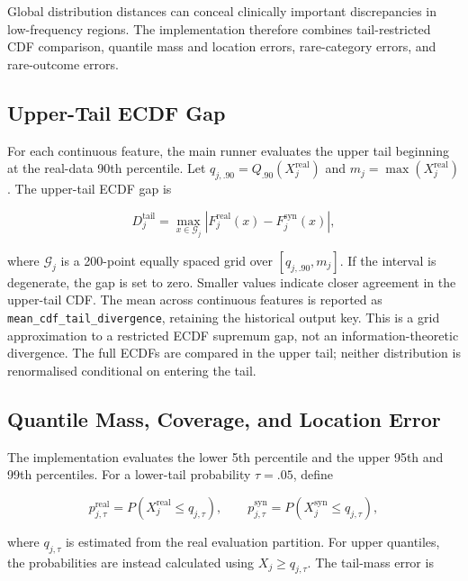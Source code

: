 Global distribution distances can conceal clinically important discrepancies
in low-frequency regions. The implementation therefore combines tail-restricted
CDF comparison, quantile mass and location errors, rare-category errors, and
rare-outcome errors.

\subsection{Upper-Tail ECDF Gap}
\label{subsec:cdf_tail_divergence}

For each continuous feature, the main runner evaluates the upper tail beginning
at the real-data 90th percentile. Let
$q_{j,.90}=Q_{.90}(X_j^{\mathrm{real}})$ and
$m_j=\max(X_j^{\mathrm{real}})$. The upper-tail ECDF gap is

\begin{equation}
    D_{j}^{\mathrm{tail}} =
    \max_{x\in\mathcal{G}_j}
    \left|F_j^{\mathrm{real}}(x)-F_j^{\mathrm{syn}}(x)\right|,
    \label{eq:evaluation_cdf_tail}
\end{equation}

where $\mathcal{G}_j$ is a 200-point equally spaced grid over
$[q_{j,.90},m_j]$. If the interval is degenerate, the gap is set to
zero. Smaller values indicate closer agreement in the upper-tail CDF. The
mean across continuous features is reported as
\texttt{mean\_cdf\_tail\_divergence}, retaining the historical output key.
This is a grid approximation to a restricted ECDF supremum gap, not an
information-theoretic divergence. The full ECDFs are compared in the upper
tail; neither distribution is renormalised conditional on entering the tail.

\subsection{Quantile Mass, Coverage, and Location Error}

The implementation evaluates the lower 5th percentile and the upper 95th and
99th percentiles. For a lower-tail probability $\tau=.05$, define

\begin{equation}
    p_{j,\tau}^{\mathrm{real}}
        =P(X_j^{\mathrm{real}}\le q_{j,\tau}),
    \qquad
    p_{j,\tau}^{\mathrm{syn}}
        =P(X_j^{\mathrm{syn}}\le q_{j,\tau}),
\end{equation}

where $q_{j,\tau}$ is estimated from the real evaluation partition. For upper
quantiles, the probabilities are instead calculated using
$X_j\ge q_{j,\tau}$. The tail-mass error is

